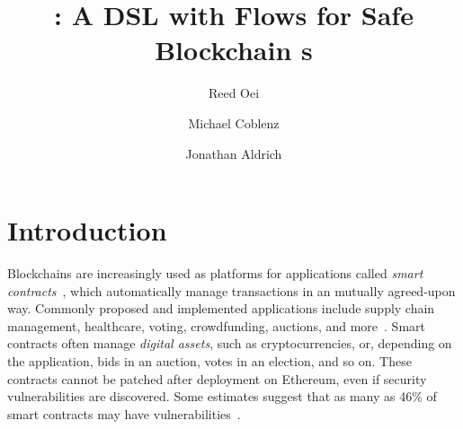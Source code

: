 \documentclass[dvipsnames,runningheads]{llncs}
\begin{document}
\title{\langName: A DSL with Flows for Safe Blockchain \AssetTxt{}s}

\author{Reed Oei \and Michael Coblenz \and Jonathan Aldrich}

\maketitle


\section{Introduction}
\vspace{-0.5em}
Blockchains are increasingly used as platforms for applications called \emph{smart contracts}~\cite{Szabo97:Formalizing}, which automatically manage transactions in an mutually agreed-upon way.
Commonly proposed and implemented applications include supply chain management, healthcare, voting, crowdfunding, auctions, and more~\cite{SupplyChainUse,HealthcareUse,Elsden18:Making}.
Smart contracts often manage \emph{digital assets}, such as cryptocurrencies, or, depending on the application, bids in an auction, votes in an election, and so on.
These contracts cannot be patched after deployment on Ethereum, even if security vulnerabilities are discovered.
Some estimates suggest that as many as 46\% of smart contracts may have vulnerabilities~\cite{luuOyente}.
\end{document}
